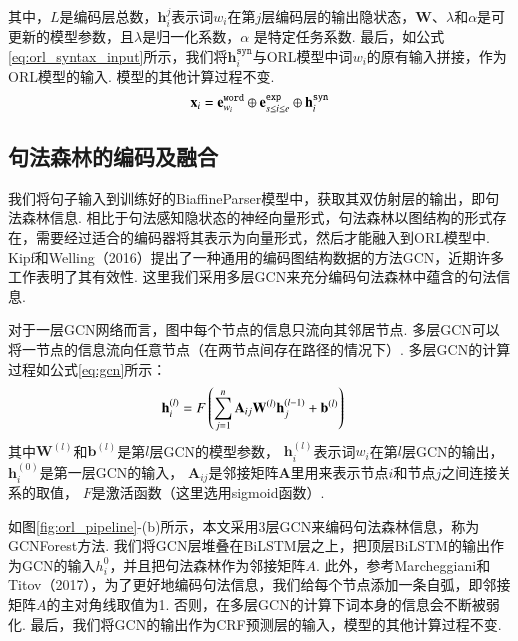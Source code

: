 其中，$L$是编码层总数，$\mathbf{h}_i^j$表示词$w_i$在第$j$层编码层的输出隐状态，$\mathbf{W}$、$\lambda$和$\alpha$是可更新的模型参数，且$\lambda$是归一化系数，$\alpha$ 是特定任务系数.
最后，如公式\ref{eq:orl_syntax_input}所示，我们将$\mathbf{h}_i^{\texttt{syn}}$与ORL模型中词$w_i$的原有输入拼接，作为ORL模型的输入. 模型的其他计算过程不变.
\begin{equation}
    \setlength{\abovedisplayskip}{9pt}
    \setlength{\belowdisplayskip}{9pt}
    \label{eq:orl_syntax_input}
    \mathbf{x}_i = \mathbf{e}_{w_i}^{\texttt{word}} \oplus \mathbf{e}_{s\leq i\leq e}^{\texttt{exp}} \oplus \mathbf{h}_i^{\texttt{syn}}
\end{equation}
\subsection{句法森林的编码及融合}
\label{sec:gcnforest}
我们将句子输入到训练好的BiaffineParser模型中，获取其双仿射层的输出，即句法森林信息.
相比于句法感知隐状态的神经向量形式，句法森林以图结构的形式存在，需要经过适合的编码器将其表示为向量形式，然后才能融入到ORL模型中.
Kipf和Welling（2016）提出了一种通用的编码图结构数据的方法GCN，近期许多工作表明了其有效性. 这里我们采用多层GCN来充分编码句法森林中蕴含的句法信息.

对于一层GCN网络而言，图中每个节点的信息只流向其邻居节点. 多层GCN可以将一节点的信息流向任意节点（在两节点间存在路径的情况下）. 多层GCN的计算过程如公式\ref{eq:gcn}所示：
\begin{equation}\label{eq:gcn}
    \setlength{\abovedisplayskip}{9pt}
    \setlength{\belowdisplayskip}{9pt}
    \begin{split}
        \mathbf{h}_i^{(l)} &= F\left(  \sum_{j=1}^n \mathbf{A}_{ij} \mathbf{W}^{(l)}\mathbf{h}_j^{(l-1)}+\mathbf{b}^{(l)} \right)
    \end{split}
\end{equation}
其中$\mathbf{W}^{(l)}$和$\mathbf{b}^{(l)}$是第$l$层GCN的模型参数， $\mathbf{h}_i^{(l)}$表示词$w_i$在第$l$层GCN的输出， $\mathbf{h}_i^{(0)}$是第一层GCN的输入， $\mathbf{A}_{ij}$是邻接矩阵$\mathbf{A}$里用来表示节点$i$和节点$j$之间连接关系的取值， $F$是激活函数（这里选用sigmoid函数）.

如图\ref{fig:orl_pipeline}-(b)所示，本文采用3层GCN来编码句法森林信息，称为GCNForest方法.
我们将GCN层堆叠在BiLSTM层之上，把顶层BiLSTM的输出作为GCN的输入$h_i^0$，并且把句法森林作为邻接矩阵$A$.
此外，参考Marcheggiani和Titov（2017），为了更好地编码句法信息，我们给每个节点添加一条自弧，即邻接矩阵$A$的主对角线取值为1. 否则，在多层GCN的计算下词本身的信息会不断被弱化. 最后，我们将GCN的输出作为CRF预测层的输入，模型的其他计算过程不变.

